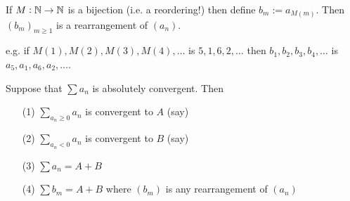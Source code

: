 \documentclass[10pt,twoside]{scrartcl}
\begin{document}
\begin{definition} 
	If $M: \mathbb{N} \to \mathbb{N}$ is a bijection (i.e. a reordering!) then define $b_m:= a_{M(m)}.$ Then $(b_m)_{m \geq 1}$ is a rearrangement of $(a_n)$.
\end{definition}

e.g. if $M(1), M(2), M(3), M(4),\dots$ is $5,1,6,2,\dots$ then $b_1,b_2,b_3,b_4,\dots$ is $a_5,a_1,a_6,a_2,\dots$.\\


\begin{theorem}
Suppose that $\sum a_n$ is absolutely convergent. Then
\begin{itemize}
\item[(1)] $\sum_{a_n \geq 0} a_n$ is convergent to $A$ (say)	
\item[(2)] $\sum_{a_n < 0} a_n$ is convergent to $B$ (say)	
\item[(3)] $\sum a_n = A+B$
\item[(4)] $\sum b_m = A+B$ where $(b_m)$ is any rearrangement of $(a_n)$
\end{itemize}
\end{theorem}
\end{document}
